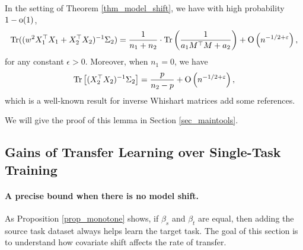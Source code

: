 \begin{lemma}\label{lem_cov_shift}
	In the setting of Theorem \ref{thm_model_shift}, we have with high probability $1-{\rm o}(1)$,
\begin{align}\label{lem_cov_shift_eq}
\operatorname{Tr} ((w^2 X_1^{\top}X_1 + X_2^{\top}X_2)^{-1}\Sigma_2) = \frac{1}{n_1+n_2}\cdot \operatorname{Tr} \left( \frac{1}{a_1 M^\top M + a_2} \right) +\operatorname{O}\left( n^{-1/2+\varepsilon}\right),
\end{align}
	for any constant $\epsilon>0$. %
	Moreover, when $n_1 = 0$, we have %
	\begin{align}\label{lem_cov_shift_eq2} \operatorname{Tr}\left[(X_2^{\top}X_2)^{-1}\Sigma_2\right] = \frac{p}{n_2-p} + \operatorname{O}\left(n^{-1/2+\varepsilon}\right), \end{align}
which is a well-known result for inverse Whishart matrices {\color{red}add some references}.
\end{lemma}
We will give the proof of this lemma in Section \ref{sec_maintools}.





\subsection{Gains of Transfer Learning over Single-Task Training}


\paragraph{A precise bound when there is no model shift.}
As Proposition \ref{prop_monotone} shows, if $\beta_s$ and $\beta_t$ are equal, then adding the source task dataset always helps learn the target task.
The goal of this section is to understand how covariate shift affects the rate of transfer. 


